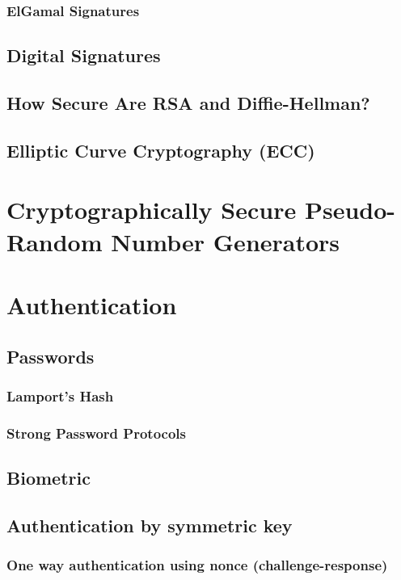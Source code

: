 	\subsubsection{ElGamal Signatures}
	
	\newpage
	\subsection{Digital Signatures}
	
	\newpage	
	\subsection{How Secure Are RSA and Diffie-Hellman?}
	
	\newpage	
	\subsection{Elliptic Curve Cryptography (ECC)}
	
	\newpage
	\section{Cryptographically Secure Pseudo-Random Number Generators}
	
	\newpage
	\section{Authentication}
	\subsection{Passwords}
	\subsubsection{Lamport’s Hash}
	\subsubsection{Strong Password Protocols}
	\subsection{Biometric}
	
	\subsection{Authentication by symmetric key}
	\subsubsection{One way authentication using nonce (challenge-response)}
